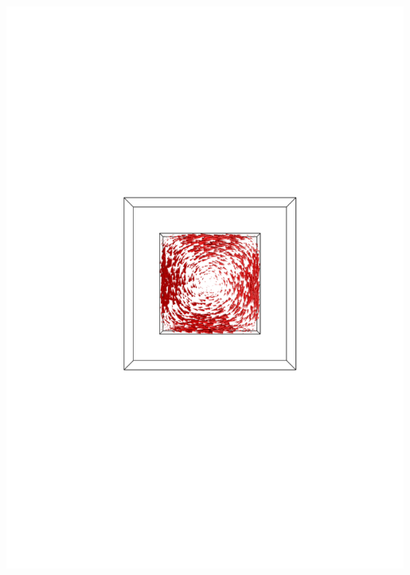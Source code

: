 \documentclass[compress]{beamer}
\begin{document}
\begin{frame}
\begin{columns}[totalwidth=\textwidth]
\begin{column}{.35\textwidth}
	\includegraphics[width=0.99\textwidth]{Graphic/04_B3cubeeddy300k_XYview.pdf}
	\end{column}
\end{columns}
\begin{columns}[totalwidth=\textwidth]
	\begin{column}{.35\textwidth}
	\centering

\end{column}
\end{columns}
\end{frame}
\end{document}
